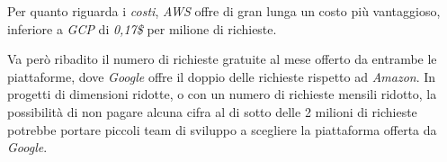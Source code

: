 Per quanto riguarda i \textit{costi}, \textit{AWS} offre di gran lunga un costo più vantaggioso, inferiore a \textit{GCP} di \textit{0,17\$} per milione di richieste.

Va però ribadito il numero di richieste gratuite al mese offerto da entrambe le piattaforme, dove \textit{Google} offre il doppio delle richieste rispetto ad \textit{Amazon}. In progetti di dimensioni ridotte, o con un numero di richieste mensili ridotto, la possibilità di non pagare alcuna cifra al di sotto delle 2 milioni di richieste potrebbe portare piccoli team di sviluppo a scegliere la piattaforma offerta da \textit{Google}.